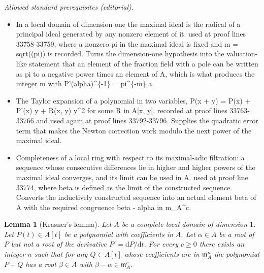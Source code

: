 \documentclass[10pt,a4paper]{amsart}
\theoremstyle{plain}
\newtheorem{lemma}[subsection]{Lemma}
\theoremstyle{definition}
\theoremstyle{remark}
\numberwithin{equation}{subsection}
\begin{document}
\noindent\textit{Allowed standard prerequisites (editorial).}\begin{itemize}
\item In a local domain of dimension one the maximal ideal is the radical of a principal ideal generated by any nonzero element of it. used at proof lines 33758-33759, where a nonzero pi in the maximal ideal is fixed and m = sqrt((pi)) is recorded. Turns the dimension-one hypothesis into the valuation-like statement that an element of the fraction field with a pole can be written as pi to a negative power times an element of A, which is what produces the integer m with P'(alpha)\textasciicircum{}\{-1\} = pi\textasciicircum{}\{-m\} a.
\item The Taylor expansion of a polynomial in two variables, P(x + y) = P(x) + P'(x) y + R(x, y) y\textasciicircum{}2 for some R in A[x, y]. recorded at proof lines 33763-33766 and used again at proof lines 33792-33796. Supplies the quadratic error term that makes the Newton correction work modulo the next power of the maximal ideal.
\item Completeness of a local ring with respect to its maximal-adic filtration: a sequence whose consecutive differences lie in higher and higher powers of the maximal ideal converges, and its limit can be used in A. used at proof line 33774, where beta is defined as the limit of the constructed sequence. Converts the inductively constructed sequence into an actual element beta of A with the required congruence beta - alpha in m\_A\textasciicircum{}c.
\end{itemize}\medskip
\begin{lemma}[Krasner's lemma]
\label{lemma-krasner}
Let $A$ be a complete local domain of dimension $1$. Let $P(t) \in A[t]$
be a polynomial with coefficients in $A$. Let $\alpha \in A$ be a root
of $P$ but not a root of the derivative $P' = \text{d}P/\text{d}t$.
For every $c \geq 0$ there exists an integer $n$ such that for any
$Q \in A[t]$ whose coefficients are in $\mathfrak m_A^n$ the polynomial
$P + Q$ has a root $\beta \in A$ with $\beta - \alpha \in \mathfrak m_A^c$.
\end{lemma}
\end{document}
